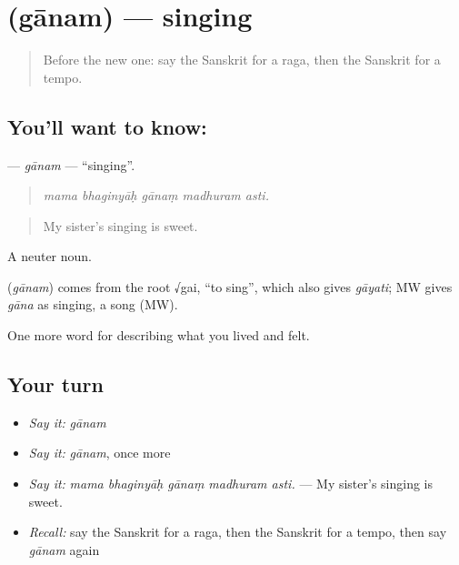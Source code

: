 \section[\texorpdfstring{\sk{गानम्} (gānam)}{गानम् (gānam)}]{ (gānam) — singing}

\label{lesson:SA-C520-ganam}



\begin{quote}
Before the new one: say the Sanskrit for a raga, then the Sanskrit for a tempo.
\end{quote}

\subsection*{You'll want to know: }
\textbf{} — \emph{gānam} — \textquotedblleft{}singing\textquotedblright{}.

\begin{quote}
    
\end{quote}

\begin{quote}
\emph{mama bhaginyāḥ gānaṃ madhuram asti.}
\end{quote}

\begin{quote}
My sister's singing is sweet.
\end{quote}

A neuter noun.

\begin{cousinweb}
\textbf{} (\emph{gānam}) comes from the root √gai, \textquotedblleft{}to sing\textquotedblright{}, which also gives \emph{gāyati}; MW gives \emph{gāna} as singing, a song (MW).
\end{cousinweb}

\begin{grammarlens}[title={What you've built}]
One more word for describing what you lived and felt.
\end{grammarlens}

\subsection*{Your turn}
\begin{itemize}
\raggedright
  \item \emph{Say it:} \emph{gānam}
  \item \emph{Say it:} \emph{gānam}, once more
  \item \emph{Say it:} \emph{mama bhaginyāḥ gānaṃ madhuram asti.} — My sister's singing is sweet.
  \item \emph{Recall:} say the Sanskrit for a raga, then the Sanskrit for a tempo, then say \emph{gānam} again
\end{itemize}

